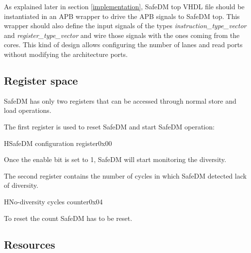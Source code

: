 As explained later in section \ref{implementation}, SafeDM top VHDL file should be instantiated in an APB wrapper to drive the APB signals to SafeDM top. This wrapper should also define the input signals of the types \textit{instruction\_type\_vector} and \textit{register\_type\_vector} and wire those signals with the ones coming from the cores. This kind of design allows configuring the number of lanes and read ports without modifying the architecture ports.


\subsection{Register space}

SafeDM has only two registers that can be accessed through normal store and load operations.  

The first register is used to reset SafeDM and start SafeDM operation:

\begin{register}{H}{SafeDM configuration register}{0x00}
	\label{cfg0}
	\regnewline
\end{register}

Once the enable bit is set to 1, SafeDM will start monitoring the diversity.

The second register contains the number of cycles in which SafeDM detected lack of diversity.

\begin{register}{H}{No-diversity cycles counter}{0x04}
	\label{no_div_cycles_reg}
	\regnewline
\end{register}

To reset the count SafeDM has to be reset.


\subsection{Resources}



\hspace{2cm}


